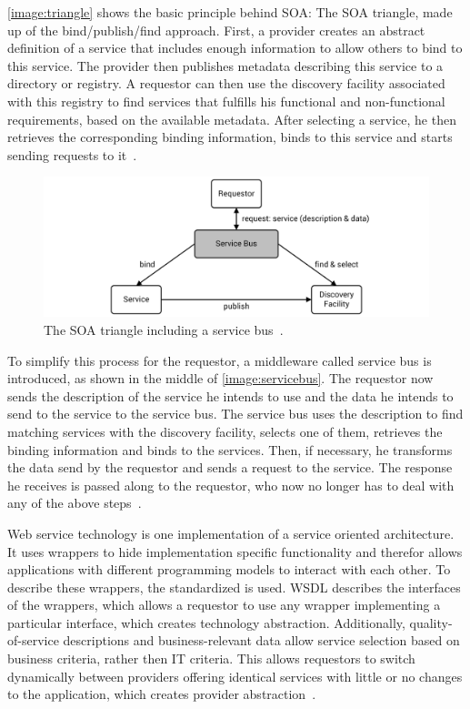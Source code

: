 \autoref{image:triangle} shows the basic principle behind SOA: The SOA triangle, made up of the bind/publish/find approach.
First, a provider creates an abstract definition of a service that includes enough information to allow others to bind to this service.
The provider then publishes metadata describing this service to a directory or registry.
A requestor can then use the discovery facility associated with this registry to find services that fulfills his functional and non-functional requirements, based on the available metadata.
After selecting a service, he then retrieves the corresponding binding information, binds to this service and starts sending requests to it~\autocite{webservices}.

\begin{figure}[!htbp]
	\centering
	\includegraphics[resolution=600]{fundamentals/assets/service_bus}
	\caption{The SOA triangle including a service bus~\autocite[based on][]{webservices}.}
	\label{image:servicebus}
\end{figure}

To simplify this process for the requestor, a middleware called service bus is introduced, as shown in the middle of \autoref{image:servicebus}.
The requestor now sends the description of the service he intends to use and the data he intends to send to the service to the service bus.
The service bus uses the description to find matching services with the discovery facility, selects one of them, retrieves the binding information and binds to the services.
Then, if necessary, he transforms the data send by the requestor and sends a request to the service.
The response he receives is passed along to the requestor, who now no longer has to deal with any of the above steps~\autocite{webservices}.

Web service technology is one implementation of a service oriented architecture.
It uses wrappers to hide implementation specific functionality and therefor allows applications with different programming models to interact with each other.
To describe these wrappers, the standardized  is used.
WSDL describes the interfaces of the wrappers, which allows a requestor to use any wrapper implementing a particular interface, which creates technology abstraction.
Additionally, quality-of-service descriptions and business-relevant data allow service selection based on business criteria, rather then IT criteria.
This allows requestors to switch dynamically between providers offering identical services with little or no changes to the application, which creates provider abstraction~\autocite{webservices}.

